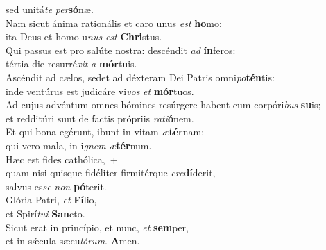 \evenverse sed unitá\textit{te} \textit{per}\textbf{só}næ.\\
\oddverse Nam sicut ánima rationális et caro unus \textit{est} \textbf{ho}mo:~\*\\
\oddverse ita Deus et homo u\textit{nus} \textit{est} \textbf{Chri}stus.\\
\evenverse Qui passus est pro salúte nostra: descéndit \textit{ad} \textbf{ín}feros:~\*\\
\evenverse tértia die resurré\textit{xit} \textit{a} \textbf{mór}tuis.\\
\oddverse Ascéndit ad cælos, sedet ad déxteram Dei Patris omni\textit{po}\textbf{tén}tis:~\*\\
\oddverse inde ventúrus est judicáre vi\textit{vos} \textit{et} \textbf{mór}tuos.\\
\evenverse Ad cujus advéntum omnes hómines resúrgere habent cum corpóri\textit{bus} \textbf{su}is;~\*\\
\evenverse et redditúri sunt de factis própriis \textit{ra}\textit{ti}\textbf{ó}nem.\\
\oddverse Et qui bona egérunt, ibunt in vitam \textit{æ}\textbf{tér}nam:~\*\\
\oddverse qui vero mala, in i\textit{gnem} \textit{æ}\textbf{tér}num.\\
\evenverse Hæc est fides cathólica,~+\\
\evenverse  quam nisi quisque fidéliter firmitérque \textit{cre}\textbf{dí}derit,~\*\\
\evenverse salvus es\textit{se} \textit{non} \textbf{pó}terit.\\
\oddverse Glória Patri, \textit{et} \textbf{Fí}lio,~\*\\
\oddverse et Spirí\textit{tu}\textit{i} \textbf{San}cto.\\
\evenverse Sicut erat in princípio, et nunc, \textit{et} \textbf{sem}per,~\*\\
\evenverse et in sǽcula sæcu\textit{ló}\textit{rum}. \textbf{A}men.\\
